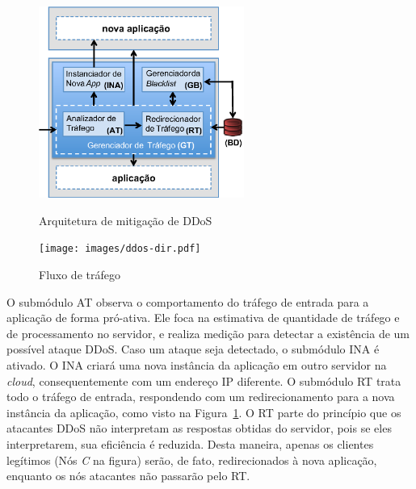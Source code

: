 \begin{figure}[t!]
  \centering
  \begin{minipage}[b]{0.59\linewidth}
    \centering
    \includegraphics[width=0.6\textwidth]{images/arq.eps}
	\caption{Arquitetura de mitigação de DDoS}
	\label{fig:arq}
  \end{minipage}
  \begin{minipage}[b]{0.4\linewidth}
    \centering
    \texttt{[image: images/ddos-dir.pdf]}
	\caption{Fluxo de tráfego}
	\label{fig:traf-ddos}
  \end{minipage}

\end{figure}



O submódulo AT observa o comportamento do tráfego de entrada para a aplicação de forma pró-ativa. Ele foca na estimativa de quantidade de tráfego e de processamento no servidor, e realiza medição para detectar a existência de um possível ataque DDoS. Caso um ataque seja detectado, o submódulo INA é ativado. O INA criará uma nova instância da aplicação em outro servidor na \emph{cloud}, consequentemente com um endereço IP diferente. %
O submódulo RT trata todo o tráfego de entrada, respondendo com um redirecionamento para a nova instância da aplicação, como visto na Figura~\ref{fig:traf-ddos}. O RT parte do princípio que os atacantes DDoS não interpretam as respostas obtidas do servidor, pois se eles interpretarem, sua eficiência é reduzida. Desta maneira, apenas os clientes legítimos (Nós \emph{C} na figura) serão, de fato, redirecionados à nova aplicação, enquanto os nós atacantes não passarão pelo RT.

